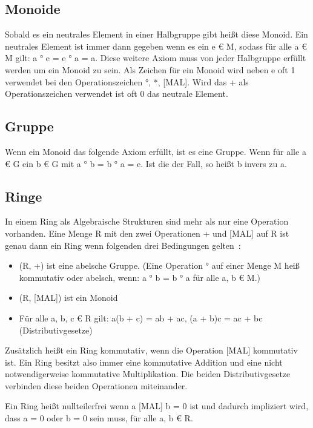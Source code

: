 		\subsection{Monoide}
			Sobald es ein neutrales Element in einer Halbgruppe gibt heißt diese Monoid. Ein neutrales Element ist immer dann gegeben wenn es ein e € M, sodass für alle a € M gilt: a ° e = e ° a = a. Diese weitere Axiom muss von jeder Halbgruppe erfüllt werden um ein Monoid zu sein. Als Zeichen für ein Monoid wird neben e oft 1 verwendet bei den Operationszeichen °, *, [MAL]. Wird das + als Operationszeichen verwendet ist oft 0 das neutrale Element.~\cite{Erste:Hilfe:in:Linearer:Algebra}
		
		\subsection{Gruppe}
			Wenn ein Monoid das folgende Axiom erfüllt, ist es eine Gruppe. Wenn für alle a € G ein b € G mit a ° b = b ° a = e. Ist die der Fall, so heißt b invers zu a.~\cite{Erste:Hilfe:in:Linearer:Algebra}
		
		\subsection{Ringe}
			In einem Ring als Algebraische Strukturen sind mehr als nur eine Operation vorhanden. Eine Menge R mit den zwei Operationen + und [MAL] auf R ist genau dann ein Ring wenn folgenden drei Bedingungen gelten~\cite{Erste:Hilfe:in:Linearer:Algebra}:
			
			\begin{itemize}
				\item (R, +) ist eine abelsche Gruppe. (Eine Operation ° auf einer Menge M heiß kommutativ oder abelsch, wenn: a ° b = b ° a für alle a, b € M.)
				\item (R, [MAL]) ist ein Monoid
				\item Für alle a, b, c € R gilt: a(b + c) = ab + ac, (a + b)c = ac + bc (Distributivgesetze)
			\end{itemize}
			
			Zusätzlich heißt ein Ring kommutativ, wenn die Operation [MAL] kommutativ ist. Ein Ring besitzt also immer eine kommutative Addition und eine nicht notwendigerweise kommutative Multiplikation. Die beiden Distributivgesetze verbinden diese beiden Operationen miteinander.~\cite{Erste:Hilfe:in:Linearer:Algebra}
			
			Ein Ring heißt nullteilerfrei wenn a [MAL] b = 0 ist und dadurch impliziert wird, dass a = 0 oder b = 0 sein muss, für alle a, b € R.~\cite{Erste:Hilfe:in:Linearer:Algebra}
			
